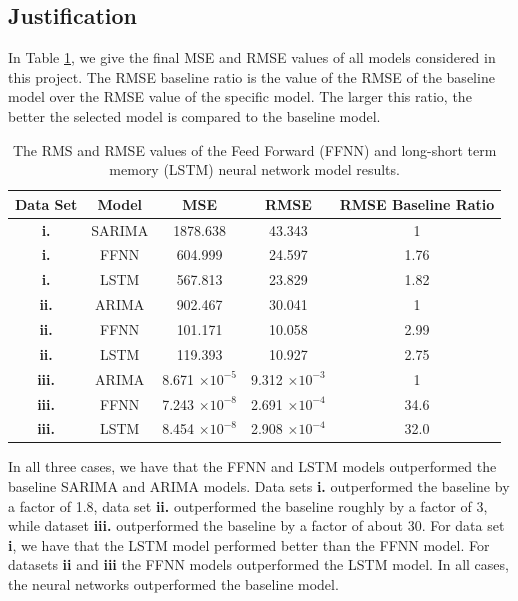 \documentclass[10pt,a4paper]{article}
\begin{document}
\subsection{Justification}
%
In Table \ref{table: RMS values of neural network models}, we give the final MSE and RMSE values of all models considered in this project. The RMSE baseline ratio is the value of the RMSE of the baseline model over the RMSE value of the specific model. The larger this ratio, the better the selected model is compared to the baseline model.
\begin{table}[h]
\centering
\begin{tabular}{cccc|c}
Data Set & Model & MSE & RMSE  & RMSE Baseline Ratio\\ \hline
{\bf i.} & SARIMA & 1878.638 & 43.343 & 1 \\
{\bf i.} & FFNN & 604.999 & 24.597 &  1.76 \\
{\bf i.} & LSTM & 567.813 & 23.829 &  1.82 \\ \hline 
{\bf ii.} & ARIMA & 902.467 & 30.041 & 1 \\
{\bf ii.} & FFNN & 101.171 & 10.058 &  2.99\\
{\bf ii.} & LSTM & 119.393 & 10.927 &  2.75 \\ \hline
{\bf iii.} & ARIMA & 8.671 $\times 10^{-5}$  &  9.312 $\times 10^{-3}$ & 1 \\
{\bf iii.} & FFNN & 7.243 $\times 10^{-8}$ & 2.691 $\times 10^{-4}$ &  34.6 \\
{\bf iii.} & LSTM & 8.454 $\times 10^{-8}$ & 2.908 $\times 10^{-4}$ &  32.0 \\ \hline
\end{tabular}
\caption{The RMS and RMSE values of the Feed Forward (FFNN) and long-short term memory (LSTM) neural network model results.}
\label{table: RMS values of neural network models}
\end{table}
In all three cases, we have that the FFNN and LSTM models outperformed the baseline SARIMA and ARIMA models. Data sets {\bf i.} outperformed the baseline by a factor of 1.8, data set {\bf ii.} outperformed the baseline roughly by a factor of 3, while dataset {\bf iii.} outperformed the baseline by a factor of about 30. For data set {\bf i}, we have that the LSTM model performed better than the FFNN model. For datasets {\bf ii} and {\bf iii} the FFNN models outperformed the LSTM model. In all cases, the neural networks outperformed the baseline model. 
\end{document}
